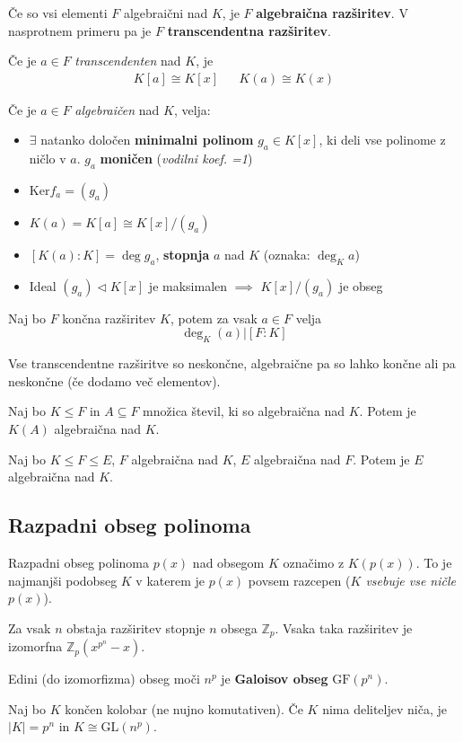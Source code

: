 Če so vsi elementi $F$ algebraični nad $K$, je $F$ \textbf{algebraična razširitev}. V nasprotnem primeru pa je $F$ \textbf{transcendentna razširitev}.

Če je $a \in F$ \emph{transcendenten} nad $K$, je
\begin{align*}
	K[a] \cong  K[x] && K(a) \cong K(x)
\end{align*}

Če je $a \in F$ \emph{algebraičen} nad $K$, velja:
\begin{itemize}
	\item $\exists$ natanko določen \textbf{minimalni polinom} $g_a \in K[x]$, ki deli vse polinome z ničlo v $a$.  $g_a$ \textbf{moničen} (\emph{vodilni koef. =1})
	\item $\text{Ker}f_a = (g_a)$
	\item $K(a) = K[a] \cong K[x] / (g_a)$
	\item $[K(a):K] = \deg g_a$, \textbf{stopnja} $a$ nad $K$ (oznaka: $\deg_K a$)
	\item Ideal $(g_a) \lhd K[x]$ je maksimalen $\implies$ $K[x] / (g_a)$ je obseg
\end{itemize}

Naj bo $F$ končna razširitev $K$, potem za vsak $a \in F$ velja 
\[\deg_K (a) \big| [F:K] \]

Vse transcendentne razširitve so neskončne, algebraične pa so lahko končne ali pa neskončne (če dodamo več elementov).

Naj bo $K \leq F$ in $A \subseteq F$ množica števil, ki so algebraična nad $K$. Potem je $K(A)$ algebraična nad $K$.

Naj bo $K \leq F \leq E$, $F$ algebraična nad $K$, $E$ algebraična nad $F$. Potem je $E$ algebraična nad $K$.

\subsection*{Razpadni obseg polinoma}
Razpadni obseg polinoma $p(x)$ nad obsegom $K$ označimo z $K(p(x))$. To je najmanjši podobseg $K$ v katerem je $p(x)$ povsem razcepen (\emph{$K$ vsebuje vse ničle $p(x)$}).

Za vsak $n$ obstaja razširitev stopnje $n$ obsega $\mathbb{Z}_p$. Vsaka taka razširitev je izomorfna $\mathbb{Z}_p (x^{p^n} - x)$.

Edini (do izomorfizma) obseg moči $n^p$ je \textbf{Galoisov obseg} $\text{GF}(p^n)$.

Naj bo $K$ končen kolobar (ne nujno komutativen). Če $K$ nima deliteljev niča, je $|K| = p^n$ in $K \cong \text{GL}(n^p)$.


